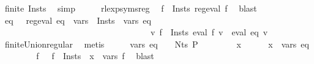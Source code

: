\begin{isabellebody}
\ {\isachardoublequoteopen}finite\ {\isacharquery}{\kern0pt}Insts{\isachardoublequoteclose}\ \isamarkupfalse%
\ simp\isanewline
\ \ \isamarkupfalse%
\ \isamarkupfalse%
\ rlexp{\isacharunderscore}{\kern0pt}syms{\isacharunderscore}{\kern0pt}reg\ \isamarkupfalse%
\ {\isachardoublequoteopen}{\isasymforall}f\ {\isasymin}\ {\isacharquery}{\kern0pt}Insts{\isachardot}{\kern0pt}\ reg{\isacharunderscore}{\kern0pt}eval\ f{\isachardoublequoteclose}\ \isamarkupfalse%
\ blast\isanewline
\ \ \isamarkupfalse%
\ \isamarkupfalse%
\ eq\ \ {\isacharasterisk}{\kern0pt}{\isacharcolon}{\kern0pt}\ {\isachardoublequoteopen}reg{\isacharunderscore}{\kern0pt}eval\ eq\ {\isasymand}\ {\isasymUnion}{\isacharparenleft}{\kern0pt}vars\ {\isacharbackquote}{\kern0pt}\ {\isacharquery}{\kern0pt}Insts{\isacharparenright}{\kern0pt}\ {\isacharequal}{\kern0pt}\ vars\ eq\isanewline
\ \ \ \ \ \ \ \ \ \ \ \ \ \ \ \ \ \ \ \ \ \ \ \ \ \ \ \ \ \ \ \ \ \ {\isasymand}\ {\isacharparenleft}{\kern0pt}{\isasymforall}v{\isachardot}{\kern0pt}\ {\isacharparenleft}{\kern0pt}{\isasymUnion}f\ {\isasymin}\ {\isacharquery}{\kern0pt}Insts{\isachardot}{\kern0pt}\ eval\ f\ v{\isacharparenright}{\kern0pt}\ {\isacharequal}{\kern0pt}\ eval\ eq\ v{\isacharparenright}{\kern0pt}{\isachardoublequoteclose}\isanewline
\ \ \ \ \isamarkupfalse%
\ finite{\isacharunderscore}{\kern0pt}Union{\isacharunderscore}{\kern0pt}regular\ \isamarkupfalse%
\ metis\isanewline
\ \ \isamarkupfalse%
\ \isamarkupfalse%
\ {\isachardoublequoteopen}vars\ eq\ {\isasymsubseteq}\ {\isasymgamma}{\isacharprime}{\kern0pt}\ {\isacharbackquote}{\kern0pt}\ Nts\ P{\isachardoublequoteclose}\isanewline
\ \ \isamarkupfalse%
\isanewline
\ \ \ \ \isamarkupfalse%
\ x\isanewline
\ \ \ \ \isamarkupfalse%
\ {\isachardoublequoteopen}x\ {\isasymin}\ vars\ eq{\isachardoublequoteclose}\isanewline
\ \ \ \ \isamarkupfalse%
\ {\isacharasterisk}{\kern0pt}\ \isamarkupfalse%
\ f\ \ {\isacharasterisk}{\kern0pt}{\isacharasterisk}{\kern0pt}{\isacharcolon}{\kern0pt}\ {\isachardoublequoteopen}f\ {\isasymin}\ {\isacharquery}{\kern0pt}Insts\ {\isasymand}\ x\ {\isasymin}\ vars\ f{\isachardoublequoteclose}\ \isamarkupfalse%
\ blast\isanewline
\ \ \ \ \isamarkupfalse%
\ \isamarkupfalse%

\end{isabellebody}
